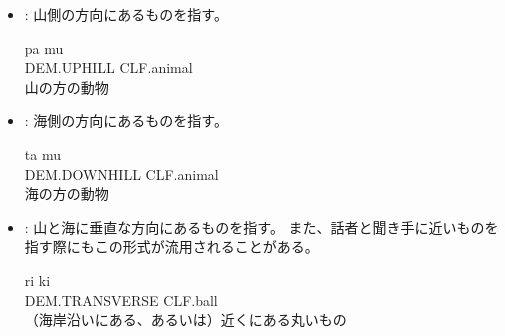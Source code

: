 \begin{itemize}
    \item {} : {山側}の方向にあるものを指す。
        \begin{exe}
            \ex \gll pa mu \\
            DEM.UPHILL CLF.animal \\
            \glt 山の方の動物
        \end{exe}
    \item {} : {海側}の方向にあるものを指す。
        \begin{exe}
            \ex \gll ta mu \\
            DEM.DOWNHILL CLF.animal \\
            \glt 海の方の動物
        \end{exe}
    \item {} : 山と海に{垂直な方向}にあるものを指す。
    また、話者と聞き手に近いものを指す際にもこの形式が流用されることがある。
        \begin{exe}
            \ex \gll ri ki \\
            DEM.TRANSVERSE CLF.ball \\
            \glt （海岸沿いにある、あるいは）近くにある丸いもの
        \end{exe}
\end{itemize}